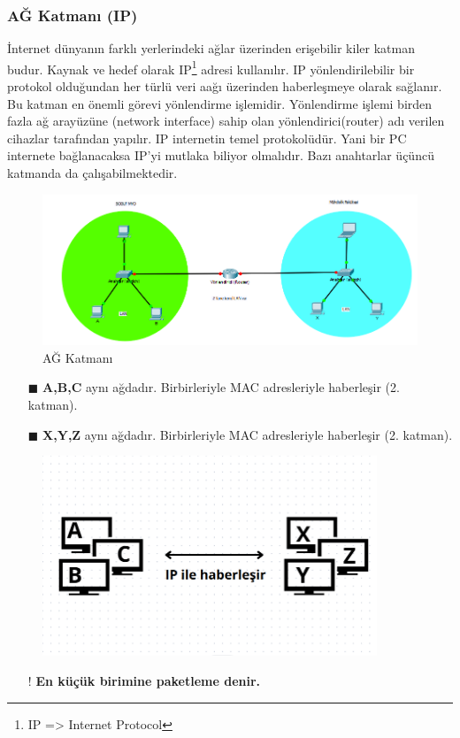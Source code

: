 \subsubsection{AĞ Katmanı (IP)}\label{subsubsec:ag_katmani}
İnternet dünyanın farklı yerlerindeki ağlar üzerinden erişebilir kiler katman budur.
Kaynak ve hedef olarak IP\footnote{IP => Internet Protocol} adresi kullanılır.
IP yönlendirilebilir bir protokol olduğundan her türlü veri aağı üzerinden haberleşmeye olarak sağlanır.
Bu katman en önemli görevi yönlendirme işlemidir.
Yönlendirme işlemi birden fazla ağ arayüzüne (network interface) sahip olan yönlendirici(router) adı verilen cihazlar tarafından yapılır.
IP internetin temel protokolüdür.
Yani bir PC internete bağlanacaksa IP'yi mutlaka biliyor olmalıdır.
Bazı anahtarlar üçüncü katmanda da çalışabilmektedir.
\begin{figure}[ht]
	\includegraphics[width=15cm]{images/ip_katman}
	\caption{AĞ Katmanı}
	\label{fig:exemple_for_network_model}
\end{figure}
\begin{enumerate}
	\item[$\blacksquare$] \textbf{A,B,C} aynı ağdadır. Birbirleriyle MAC adresleriyle haberleşir (2. katman).
	\item[$\blacksquare$] \textbf{X,Y,Z} aynı ağdadır. Birbirleriyle MAC adresleriyle haberleşir (2. katman).
\end{enumerate}
\begin{figure}[ht]
	\centering
	\includegraphics[width=10cm]{images/ip_communication}
	\label{fig:exemple_for_ip_communication}
\end{figure}
\begin{enumerate}
	\item[!] \textbf{En küçük birimine paketleme denir.}
\end{enumerate}

